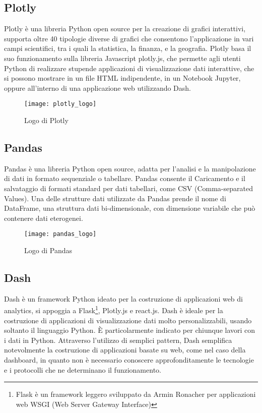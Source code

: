\subsection{Plotly}

Plotly è una libreria Python open source  per la creazione di grafici interattivi, supporta oltre 40 tipologie diverse di grafici che consentono l’applicazione in vari campi scientifici, tra i quali la statistica, la finanza, e la geografia.
Plotly basa il suo funzionamento sulla libreria Javascript plotly.js, che permette agli utenti Python di realizzare stupende applicazioni di visualizzazione dati interattive, che si possono mostrare in un file HTML indipendente, in un Notebook Jupyter\footnotemark, oppure all’interno di una applicazione web utilizzando Dash.

\begin{figure}[htp]
    \centering
    \texttt{[image: plotly\_logo]}
    \caption{Logo di Plotly}
\end{figure}

\subsection{Pandas}
Pandas è una libreria Python open source, adatta per l’analisi e la manipolazione di dati in formato sequenziale o tabellare.
Pandas consente il Caricamento e il salvataggio di formati standard per dati tabellari, come CSV (Comma-separated Values).
Una delle strutture dati utilizzate da Pandas prende il nome di DataFrame, una struttura dati bi-dimensionale, con dimensione variabile che può contenere dati eterogenei.
\begin{figure}[htp]
    \centering
    \texttt{[image: pandas\_logo]}
    \caption{Logo di Pandas}
\end{figure}

\subsection{Dash}
Dash è un framework Python ideato per la costruzione di applicazioni web di analytics, si appoggia a Flask\footnote{Flask è un framework leggero sviluppato da Armin Ronacher per applicazioni web WSGI
(Web Server Gateway Interface)}, Plotly.js e react.js\footnotemark.
Dash è ideale per la costruzione di applicazioni di visualizzazione dati molto personalizzabili, usando soltanto il linguaggio Python. 
È particolarmente indicato per chiunque lavori con i dati in Python.
Attraverso l’utilizzo di semplici pattern, Dash semplifica notevolmente la costruzione di applicazioni basate su web, come nel caso della dashboard, in quanto non è necessario conoscere approfonditamente le tecnologie e i protocolli che ne determinano il funzionamento.

